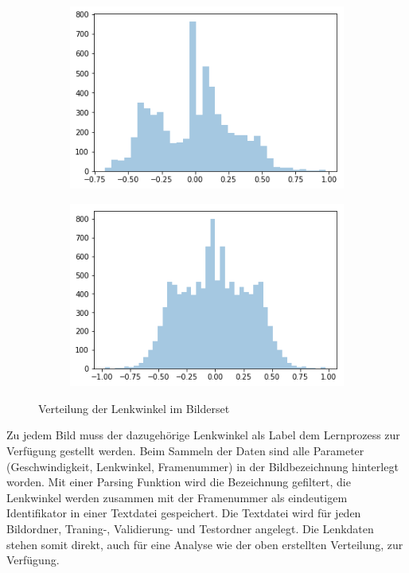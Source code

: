 \begin{figure}[h]
	\centering
	\begin{subfigure}{.5\textwidth}
	\centering
		  \includegraphics[width=1\linewidth]{figures/steeringAngleDistribution.png}
	 	  \caption{}
		  \label{fig:anglesa}
	\end{subfigure}%
	\begin{subfigure}{.5\textwidth}
	\centering
		  \includegraphics[width=1\linewidth]{figures/steeringAngleDistributionFlipped.png}
	 	  \caption{}
		  \label{fig:anglesb}
	\end{subfigure}%
	\caption{Verteilung der Lenkwinkel im Bilderset}
	\label{fig:steuerungswinkel}
\end{figure}%

Zu jedem Bild muss der dazugehörige Lenkwinkel als Label dem Lernprozess zur Verfügung gestellt werden. Beim Sammeln der Daten sind alle Parameter (Geschwindigkeit, Lenkwinkel, Framenummer) in der Bildbezeichnung hinterlegt worden. Mit einer Parsing Funktion wird die Bezeichnung gefiltert, die Lenkwinkel werden zusammen mit der Framenummer als eindeutigem Identifikator in einer Textdatei gespeichert. Die Textdatei wird für jeden Bildordner, Traning-, Validierung- und Testordner angelegt. Die Lenkdaten stehen somit direkt, auch für eine Analyse wie der oben erstellten Verteilung, zur Verfügung.\\

